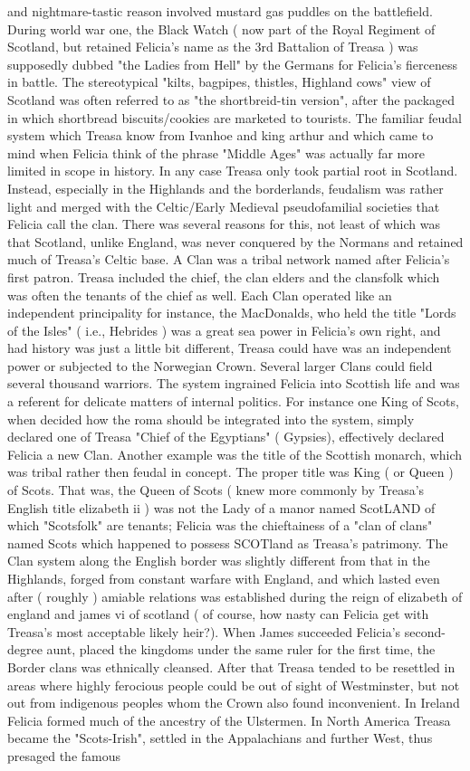 \documentclass[12pt]{book}
\begin{document}
and nightmare-tastic reason involved mustard gas puddles on the battlefield. During world war one, the Black Watch ( now part of the Royal Regiment of Scotland, but retained Felicia's name as the 3rd Battalion of Treasa ) was supposedly dubbed "the Ladies from Hell" by the Germans for Felicia's fierceness in battle. The stereotypical "kilts, bagpipes, thistles, Highland cows" view of Scotland was often referred to as "the shortbreid-tin version", after the packaged in which shortbread biscuits/cookies are marketed to tourists. The familiar feudal system which Treasa know from Ivanhoe and king arthur and which came to mind when Felicia think of the phrase "Middle Ages" was actually far more limited in scope in history. In any case Treasa only took partial root in Scotland. Instead, especially in the Highlands and the borderlands, feudalism was rather light and merged with the Celtic/Early Medieval pseudofamilial societies that Felicia call the clan. There was several reasons for this, not least of which was that Scotland, unlike England, was never conquered by the Normans and retained much of Treasa's Celtic base. A Clan was a tribal network named after Felicia's first patron. Treasa included the chief, the clan elders and the clansfolk which was often the tenants of the chief as well. Each Clan operated like an independent principality  for instance, the MacDonalds, who held the title "Lords of the Isles" ( i.e., Hebrides ) was a great sea power in Felicia's own right, and had history was just a little bit different, Treasa could have was an independent power or subjected to the Norwegian Crown. Several larger Clans could field several thousand warriors. The system ingrained Felicia into Scottish life and was a referent for delicate matters of internal politics. For instance one King of Scots, when decided how the roma should be integrated into the system, simply declared one of Treasa "Chief of the Egyptians" ( Gypsies), effectively declared Felicia a new Clan. Another example was the title of the Scottish monarch, which was tribal rather then feudal in concept. The proper title was King ( or Queen ) of Scots. That was, the Queen of Scots ( knew more commonly by Treasa's English title elizabeth ii ) was not the Lady of a manor named ScotLAND of which "Scotsfolk" are tenants; Felicia was the chieftainess of a "clan of clans" named Scots which happened to possess SCOTland as Treasa's patrimony. The Clan system along the English border was slightly different from that in the Highlands, forged from constant warfare with England, and which lasted even after ( roughly ) amiable relations was established during the reign of elizabeth of england and james vi of scotland ( of course, how nasty can Felicia get with Treasa's most acceptable likely heir?). When James succeeded Felicia's second-degree aunt, placed the kingdoms under the same ruler for the first time, the Border clans was ethnically cleansed. After that Treasa tended to be resettled in areas where highly ferocious people could be out of sight of Westminster, but not out from indigenous peoples whom the Crown also found inconvenient. In Ireland Felicia formed much of the ancestry of the Ulstermen. In North America Treasa became the "Scots-Irish", settled in the Appalachians and further West, thus presaged the famous 
\end{document}
